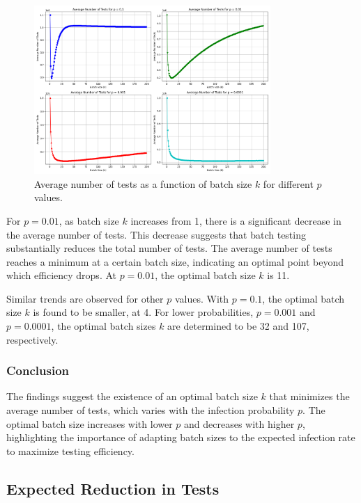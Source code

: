 \documentclass[12pt]{article}
\begin{document}
\begin{figure}[ht]
\centering
\includegraphics[width=0.8\textwidth]{image/1_MC_exploration.png}
\caption{Average number of tests as a function of batch size \( k \) for different \( p \) values.}
\end{figure}

For \( p = 0.01 \), as batch size \( k \) increases from 1, there is a significant decrease in the average number of tests. This decrease suggests that batch testing substantially reduces the total number of tests. The average number of tests reaches a minimum at a certain batch size, indicating an optimal point beyond which efficiency drops. At \( p = 0.01 \), the optimal batch size \( k \) is 11.

Similar trends are observed for other \( p \) values. With \( p = 0.1 \), the optimal batch size \( k \) is found to be smaller, at 4. For lower probabilities, \( p = 0.001 \) and \( p = 0.0001 \), the optimal batch sizes \( k \) are determined to be 32 and 107, respectively. 

\subsubsection*{Conclusion}

The findings suggest the existence of an optimal batch size \( k \) that minimizes the average number of tests, which varies with the infection probability \( p \). The optimal batch size increases with lower \( p \) and decreases with higher \( p \), highlighting the importance of adapting batch sizes to the expected infection rate to maximize testing efficiency.

\subsection{Expected Reduction in Tests}
\end{document}
